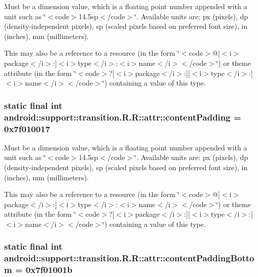 Must be a dimension value, which is a floating point number appended with a unit such as \char`\"{}$<$code$>$14.5sp$<$/code$>$\char`\"{}. Available units are: px (pixels), dp (density-independent pixels), sp (scaled pixels based on preferred font size), in (inches), mm (millimeters). 

This may also be a reference to a resource (in the form \char`\"{}$<$code$>$@\mbox{[}$<$i$>$package$<$/i$>$:\mbox{]}$<$i$>$type$<$/i$>$:$<$i$>$name$<$/i$>$$<$/code$>$\char`\"{}) or theme attribute (in the form \char`\"{}$<$code$>$?\mbox{[}$<$i$>$package$<$/i$>$:\mbox{]}\mbox{[}$<$i$>$type$<$/i$>$:\mbox{]}$<$i$>$name$<$/i$>$$<$/code$>$\char`\"{}) containing a value of this type. \hypertarget{classandroid_1_1support_1_1transition_1_1_r_1_1attr_f360c6caccebecb4eca6c30842ac1798}{
\subsubsection[{contentPadding}]{\setlength{\rightskip}{0pt plus 5cm}static final int android::support::transition.R.R::attr::contentPadding = 0x7f010017}}
\label{classandroid_1_1support_1_1transition_1_1_r_1_1attr_f360c6caccebecb4eca6c30842ac1798}


Must be a dimension value, which is a floating point number appended with a unit such as \char`\"{}$<$code$>$14.5sp$<$/code$>$\char`\"{}. Available units are: px (pixels), dp (density-independent pixels), sp (scaled pixels based on preferred font size), in (inches), mm (millimeters). 

This may also be a reference to a resource (in the form \char`\"{}$<$code$>$@\mbox{[}$<$i$>$package$<$/i$>$:\mbox{]}$<$i$>$type$<$/i$>$:$<$i$>$name$<$/i$>$$<$/code$>$\char`\"{}) or theme attribute (in the form \char`\"{}$<$code$>$?\mbox{[}$<$i$>$package$<$/i$>$:\mbox{]}\mbox{[}$<$i$>$type$<$/i$>$:\mbox{]}$<$i$>$name$<$/i$>$$<$/code$>$\char`\"{}) containing a value of this type. \hypertarget{classandroid_1_1support_1_1transition_1_1_r_1_1attr_722cfb6f8e6af75a222e245695d4af21}{
\subsubsection[{contentPaddingBottom}]{\setlength{\rightskip}{0pt plus 5cm}static final int android::support::transition.R.R::attr::contentPaddingBottom = 0x7f01001b}}
\label{classandroid_1_1support_1_1transition_1_1_r_1_1attr_722cfb6f8e6af75a222e245695d4af21}


